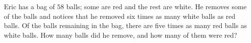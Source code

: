 Eric has a bag of $58$ balls; some are red and the rest are white. He removes some of the balls and notices that he removed six times as many white balls as red balls. Of the balls remaining in the bag, there are five times as many red balls as white balls. How many balls did he remove, and how many of them were red?
